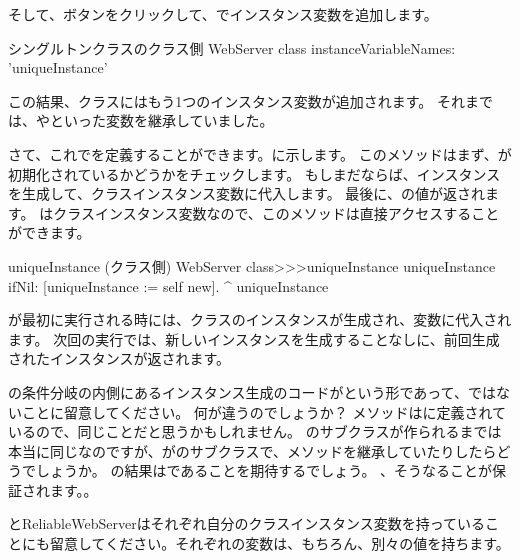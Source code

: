 \documentclass[a4paper,10pt,twoside]{book}
\begin{document}
そして、ボタンをクリックして、でインスタンス変数を追加します。

\begin{classdef}[webserver]{シングルトンクラスのクラス側}
WebServer class 	
	instanceVariableNames: 'uniqueInstance'
\end{classdef}

この結果、クラスにはもう1つのインスタンス変数が追加されます。
それまでは、やといった変数を継承していました。

さて、これでを定義することができます。に示します。
このメソッドはまず、が初期化されているかどうかをチェックします。
もしまだならば、インスタンスを生成して、クラスインスタンス変数に代入します。
最後に、の値が返されます。
はクラスインスタンス変数なので、このメソッドは直接アクセスすることができます。
    
\begin{method}[uniqueInstance]{uniqueInstance (クラス側)}
WebServer class>>>uniqueInstance
     uniqueInstance ifNil: [uniqueInstance := self new].
     ^ uniqueInstance
\end{method}

が最初に実行される時には、クラスのインスタンスが生成され、変数に代入されます。
次回の実行では、新しいインスタンスを生成することなしに、前回生成されたインスタンスが返されます。

の条件分岐の内側にあるインスタンス生成のコードがという形であって、ではないことに留意してください。
何が違うのでしょうか？
メソッドはに定義されているので、同じことだと思うかもしれません。
のサブクラスが作られるまでは本当に同じなのですが、がのサブクラスで、メソッドを継承していたりしたらどうでしょうか。
の結果はであることを期待するでしょう。
、そうなることが保証されます。。

と{ReliableWebServer}はそれぞれ自分のクラスインスタンス変数を持っていることにも留意してください。それぞれの変数は、もちろん、別々の値を持ちます。

\end{document}
